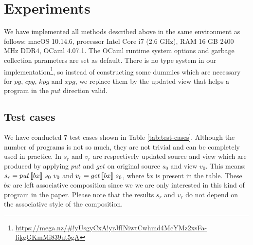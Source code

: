 \section{Experiments}

We have implemented all methods described above in the same environment as follows: macOS 10.14.6, processor Intel Core i7 (2.6 GHz), RAM 16 GB 2400 MHz DDR4, OCaml 4.07.1. The OCaml runtime system options and garbage collection parameters are set as default. There is no type system in our implementation\footnote{\url{https://mega.nz/\#!yUsgyCxA!yrJfINiwtCwhmd4McYMz2xsFa-ljkgGKmMi839ut5gA}}, so instead of constructing some dummies which are necessary for $pg$, $cpg$, $kpg$ and $xpg$, we replace them by the updated view that helps a program in the $put$ direction valid.

\subsection{Test cases}

We have conducted 7 test cases shown in Table \ref{tab:test-cases}. Although the number of programs is not so much, they are not trivial and can be completely used in practice. In $s_r$ and $v_r$ are respectively updated source and view which are produced by applying $put$ and $get$ on original source $s_0$ and view $v_0$. This means: $s_r = put \, [\![bx]\!] \ s_0 \ v_0$ and $v_r = get \, [\![bx]\!] \ s_0$, where $bx$ is present in the table. These $bx$ are left associative composition since we we are only interested in this kind of program in the paper. Please note that the results $s_r$ and $v_r$ do not depend on the associative style of the composition.

